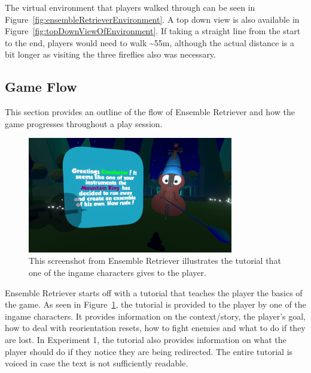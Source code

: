 The virtual environment that players walked through can be seen in Figure~\ref{fig:ensembleRetrieverEnvironment}. A top down view is also available in Figure~\ref{fig:topDownViewOfEnvironment}. If taking a straight line from the start to the end, players would need to walk \textasciitilde55m, although the actual distance is a bit longer as visiting the three fireflies also was necessary. 

\subsection{Game Flow}
This section provides an outline of the flow of Ensemble Retriever and how the game progresses throughout a play session. 

\begin{figure}[tbph]
    \centering
    \includegraphics[width=0.8\textwidth]{figures/screenshots/Tutorial.png}
    \caption[Screenshot of the Tutorial in Ensemble Retriever]{This screenshot from Ensemble Retriever illustrates the tutorial that one of the ingame characters gives to the player.}
    \label{fig:tutorial}
\end{figure}

Ensemble Retriever starts off with a tutorial that teaches the player the basics of the game. As seen in Figure~\ref{fig:tutorial}, the tutorial is provided to the player by one of the ingame characters. It provides information on the context/story, the player's goal, how to deal with reorientation resets, how to fight enemies and what to do if they are lost. In Experiment 1, the tutorial also provides information on what the player should do if they notice they are being redirected. The entire tutorial is voiced in case the text is not sufficiently readable.

